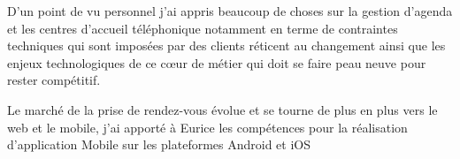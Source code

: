 D'un point de vu personnel j'ai appris beaucoup de choses sur la gestion d'agenda et les centres d'accueil téléphonique notamment
en terme de contraintes techniques qui sont imposées par des clients réticent au changement 
ainsi que les enjeux technologiques de ce cœur de métier qui doit se faire peau neuve 
pour rester compétitif.

Le marché de la prise de rendez-vous évolue et se tourne de plus en plus vers le 
web et le mobile, j'ai apporté à Eurice les compétences pour la réalisation d'application 
Mobile sur les plateformes Android et iOS\newline
